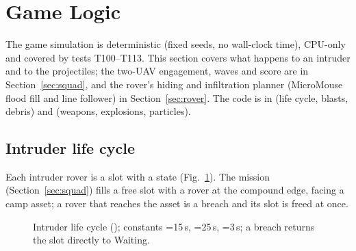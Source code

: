 \section{Game Logic}\label{sec:game}
The game simulation is deterministic (fixed seeds, no wall-clock time), CPU-only and covered by tests T100--T113. This
section covers what happens to an intruder and to the projectiles; the two-UAV engagement, waves and score are in
Section~\ref{sec:squad}, and the rover's hiding and infiltration planner (MicroMouse flood fill and line follower) in
Section~\ref{sec:rover}. The code is in  (life cycle, blasts, debris) and  (weapons, explosions, particles).

\subsection{Intruder life cycle}
Each intruder rover is a slot with a  state (Fig.~\ref{fig:life}). The mission (Section~\ref{sec:squad}) fills a free slot
with a rover at the compound edge, facing a camp asset; a rover that reaches the asset is a breach and its slot is freed at once.
\begin{figure}[h]
\centering
{}
\caption{Intruder life cycle (); constants =15\,s, =25\,s,
=3\,s; a breach returns the slot directly to Waiting.}
\label{fig:life}
\end{figure}

